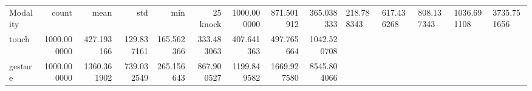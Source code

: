 \begin{tabular}{lrrrrrrrr}
\toprule
Modality & count & mean & std & min & 25%
\midrule
knock & 1000.000000 & 871.501912 & 365.038333 & 218.788343 & 617.436268 & 808.137343 & 1036.691108 & 3735.751656 \\
touch & 1000.000000 & 427.193166 & 129.837161 & 165.562366 & 333.483063 & 407.641363 & 497.765664 & 1042.520708 \\
gesture & 1000.000000 & 1360.361902 & 739.032549 & 265.156643 & 867.900527 & 1199.849582 & 1669.927580 & 8545.804066 \\
\bottomrule
\end{tabular}
